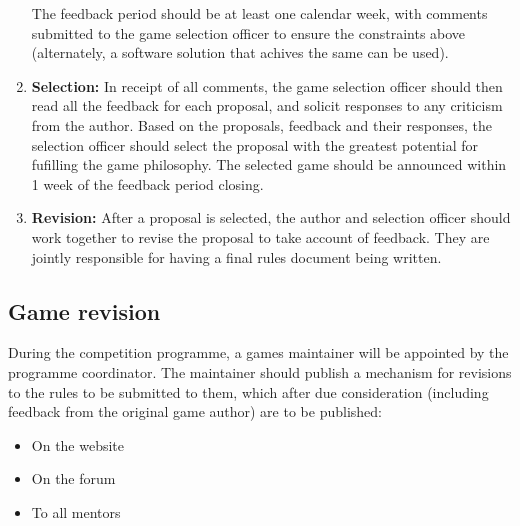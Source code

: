 \begin{enumerate}
		The feedback period should be at least one calendar week, with
		comments submitted to the game selection officer to ensure the
		constraints above (alternately, a software solution that
		achives the same can be used).
	\item \textbf{Selection:} In receipt of all comments, the game
		selection officer should then read all the feedback for each
		proposal, and solicit responses to any criticism from the
		author. Based on the proposals, feedback and their responses, 
		the selection officer should select the proposal with the
		greatest potential for fufilling the game philosophy. The
		selected game should be announced within 1 week of the feedback
		period closing.
	\item \textbf{Revision:} After a proposal is selected, the author
		and selection officer should work together to revise the
		proposal to take account of feedback. They are jointly
		responsible for having a final rules document being
		written.
\end{enumerate}

\subsection{Game revision}

During the competition programme, a games maintainer will be appointed by the
programme coordinator. The maintainer should publish a mechanism for revisions
to the rules to be submitted to them, which after due consideration (including
feedback from the original game author) are to be published:
\begin{itemize}
	\item On the website
	\item On the forum
	\item To all mentors
\end{itemize}
